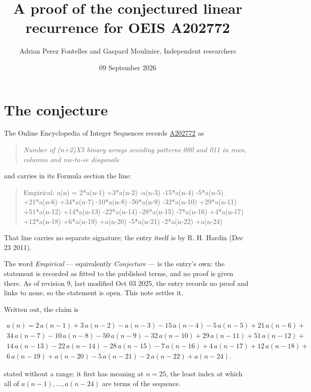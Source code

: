 \documentclass[11pt]{article}
\title{A proof of the conjectured linear recurrence for OEIS A202772}
\author{Adrian Perez Fontelles and Gaspard Moulinier, Independent researchers}
\date{09 September 2026}
\theoremstyle{definition}
\begin{document}
\maketitle
\section{The conjecture}

The Online Encyclopedia of Integer Sequences records \href{https://oeis.org/A202772}{A202772} as

\begin{quote}\itshape Number of (n+2)X5 binary arrays avoiding patterns 000 and 011 in rows, columns and nw-to-se diagonals\end{quote}

and carries in its Formula section the line:

\begin{quote}\ttfamily Empirical: a(n) = 2*a(n-1) +3*a(n-2) -a(n-3) -15*a(n-4) -5*a(n-5) +21*a(n-6) +34*a(n-7) -10*a(n-8) -50*a(n-9) -32*a(n-10) +29*a(n-11) +51*a(n-12) +14*a(n-13) -22*a(n-14) -28*a(n-15) -7*a(n-16) +4*a(n-17) +12*a(n-18) +6*a(n-19) +a(n-20) -5*a(n-21) -2*a(n-22) +a(n-24)\end{quote}

That line carries no separate signature; the entry itself is by R. H. Hardin (Dec 23 2011).

The word {\itshape Empirical} --- equivalently {\itshape Conjecture} --- is the entry's own: the statement is recorded as fitted to the published terms, and no proof is given there. As of revision 9, last modified Oct 03 2025, the entry records no proof and links to none, so the statement is open. This note settles it.

Written out, the claim is

\begin{multline*} a(n) = 2\,a(n-1) + 3\,a(n-2) - a(n-3) - 15\,a(n-4) - 5\,a(n-5) + 21\,a(n-6) + \\ 34\,a(n-7) - 10\,a(n-8) - 50\,a(n-9) - 32\,a(n-10) + 29\,a(n-11) + 51\,a(n-12) + \\ 14\,a(n-13) - 22\,a(n-14) - 28\,a(n-15) - 7\,a(n-16) + 4\,a(n-17) + 12\,a(n-18) + \\ 6\,a(n-19) + a(n-20) - 5\,a(n-21) - 2\,a(n-22) + a(n-24). \end{multline*}

stated without a range; it first has meaning at $n = 25$, the least index at which all of $a(n-1),\dots,a(n-24)$ are terms of the sequence.
\end{document}
